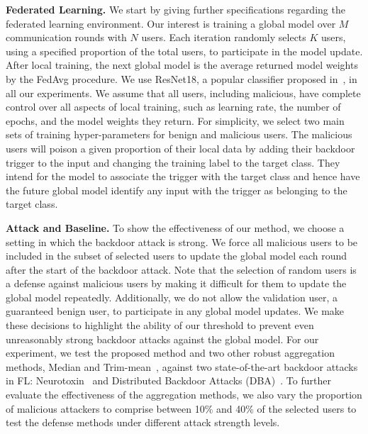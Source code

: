 \documentclass{article} %
\begin{document}
\textbf{Federated Learning.} We start by giving further specifications regarding the federated learning environment. Our interest is training a global model over $M$ communication rounds with $N$ users. Each iteration randomly selects $K$ users, using a specified proportion of the total users, to participate in the model update. After local training, the next global model is the average returned model weights by the FedAvg procedure. We use ResNet18, a popular classifier proposed in~\cite{resnet}, in all our experiments. We assume that all users, including malicious, have complete control over all aspects of local training, such as learning rate, the number of epochs, and the model weights they return. For simplicity, we select two main sets of training hyper-parameters for benign and malicious users. The malicious users will poison a given proportion of their local data by adding their backdoor trigger to the input and changing the training label to the target class. They intend for the model to associate the trigger with the target class and hence have the future global model identify any input with the trigger as belonging to the target class. 

\textbf{Attack and Baseline.} To show the effectiveness of our method, we choose a setting in which the backdoor attack is strong. We force all malicious users to be included in the subset of selected users to update the global model each round after the start of the backdoor attack. Note that the selection of random users is a defense against malicious users by making it difficult for them to update the global model repeatedly. Additionally, we do not allow the validation user, a guaranteed benign user, to participate in any global model updates. We make these decisions to highlight the ability of our threshold to prevent even unreasonably strong backdoor attacks against the global model. For our experiment, we test the proposed method and two other robust aggregation methods, Median and Trim-mean~\citep{trim-mean}, against two state-of-the-art backdoor attacks in FL: Neurotoxin~\citep{neurotoxin} and Distributed Backdoor Attacks (DBA)~\citep{dba}. To further evaluate the effectiveness of the aggregation methods, we also vary the proportion of malicious attackers to comprise between 10\% and 40\% of the selected users to test the defense methods under different attack strength levels.
\end{document}
